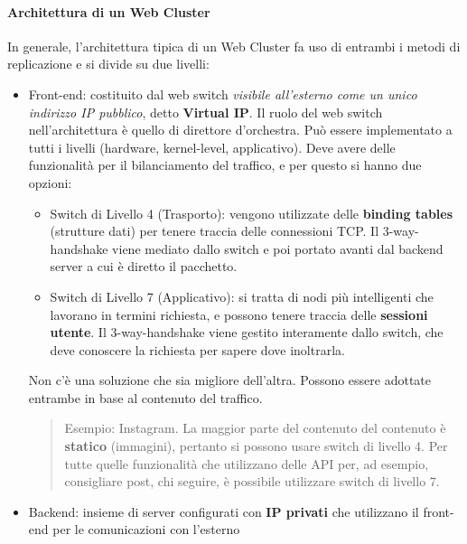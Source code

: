 \documentclass{article}
\providecommand{\tightlist}{%
		  \setlength{\itemsep}{0pt}\setlength{\parskip}{0pt}}
\begin{document}
		\paragraph{Architettura di un Web Cluster}\label{architettura-di-un-web-cluster}
		In generale, l'architettura tipica di un Web Cluster fa uso di entrambi i metodi di replicazione e si divide su due livelli:
		\begin{itemize}
		\item
		  Front-end: costituito dal web switch \emph{visibile
		  all'esterno come un unico indirizzo IP pubblico}, detto \textbf{Virtual IP}. Il ruolo del web switch nell'architettura è quello di direttore d'orchestra. Può essere implementato a tutti i livelli (hardware, kernel-level, applicativo). Deve avere delle funzionalità per il bilanciamento del traffico, e per questo si hanno due opzioni:
		
		  \begin{itemize}
		  \tightlist
		  \item
		    Switch di Livello 4 (Trasporto): vengono utilizzate delle \textbf{binding tables} (strutture dati) per tenere traccia delle connessioni TCP. Il 3-way-handshake viene mediato dallo switch e poi portato avanti dal backend server a cui è diretto il pacchetto.
		  \item
		    Switch di Livello 7 (Applicativo): si tratta di nodi più intelligenti che lavorano in termini richiesta, e possono tenere traccia delle \textbf{sessioni utente}. Il 3-way-handshake viene gestito interamente dallo switch, che deve conoscere la richiesta per sapere dove inoltrarla.
		  \end{itemize}
		
		  Non c'è una soluzione che sia migliore dell'altra. Possono essere adottate entrambe in base al contenuto del traffico.
		
		  \begin{quote}
		  Esempio: Instagram. La maggior parte del
		  contenuto del contenuto è \textbf{statico}
		  (immagini), pertanto si possono usare switch di livello 4. Per
		  tutte quelle funzionalità che utilizzano delle API per, ad esempio, consigliare post, chi seguire, è possibile utilizzare
		  switch di livello 7.
		  \end{quote}
		\item
		  Backend: insieme di server configurati con \textbf{IP privati} che utilizzano il front-end per le comunicazioni con
		  l'esterno
		\end{itemize}
		
\end{document}
